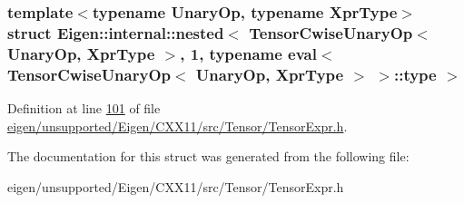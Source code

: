 \subsubsection*{template$<$typename Unary\+Op, typename Xpr\+Type$>$\newline
struct Eigen\+::internal\+::nested$<$ Tensor\+Cwise\+Unary\+Op$<$ Unary\+Op, Xpr\+Type $>$, 1, typename eval$<$ Tensor\+Cwise\+Unary\+Op$<$ Unary\+Op, Xpr\+Type $>$ $>$\+::type $>$}



Definition at line \hyperlink{eigen_2unsupported_2_eigen_2_c_x_x11_2src_2_tensor_2_tensor_expr_8h_source_l00101}{101} of file \hyperlink{eigen_2unsupported_2_eigen_2_c_x_x11_2src_2_tensor_2_tensor_expr_8h_source}{eigen/unsupported/\+Eigen/\+C\+X\+X11/src/\+Tensor/\+Tensor\+Expr.\+h}.



The documentation for this struct was generated from the following file\+:\begin{DoxyCompactItemize}
\item 
eigen/unsupported/\+Eigen/\+C\+X\+X11/src/\+Tensor/\+Tensor\+Expr.\+h\end{DoxyCompactItemize}
